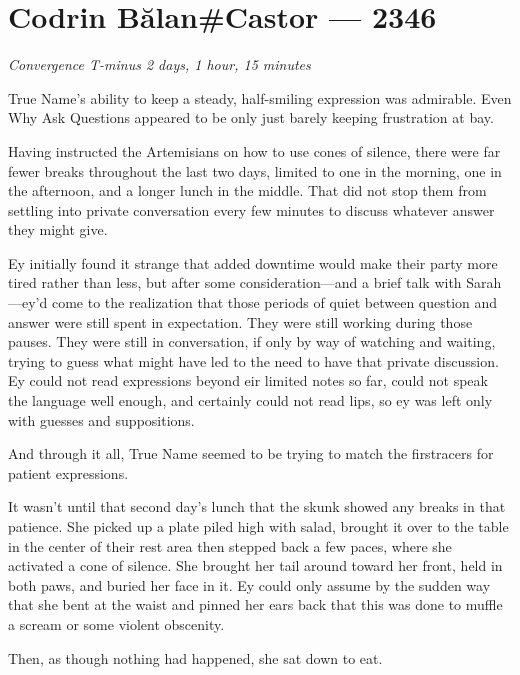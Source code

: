 \hypertarget{codrin-bux103lancastor-2346}{%
\chapter{Codrin Bălan\#Castor — 2346}}

\begin{center}
\emph{Convergence T-minus 2 days, 1 hour, 15 minutes}
\end{center}

\noindent True Name's ability to keep a steady, half-smiling expression was admirable. Even Why Ask Questions appeared to be only just barely keeping frustration at bay.

Having instructed the Artemisians on how to use cones of silence, there were far fewer breaks throughout the last two days, limited to one in the morning, one in the afternoon, and a longer lunch in the middle. That did not stop them from settling into private conversation every few minutes to discuss whatever answer they might give.

Ey initially found it strange that added downtime would make their party more tired rather than less, but after some consideration—and a brief talk with Sarah—ey'd come to the realization that those periods of quiet between question and answer were still spent in expectation. They were still working during those pauses. They were still in conversation, if only by way of watching and waiting, trying to guess what might have led to the need to have that private discussion. Ey could not read expressions beyond eir limited notes so far, could not speak the language well enough, and certainly could not read lips, so ey was left only with guesses and suppositions.

And through it all, True Name seemed to be trying to match the firstracers for patient expressions.

It wasn't until that second day's lunch that the skunk showed any breaks in that patience. She picked up a plate piled high with salad, brought it over to the table in the center of their rest area then stepped back a few paces, where she activated a cone of silence. She brought her tail around toward her front, held in both paws, and buried her face in it. Ey could only assume by the sudden way that she bent at the waist and pinned her ears back that this was done to muffle a scream or some violent obscenity.

Then, as though nothing had happened, she sat down to eat.

